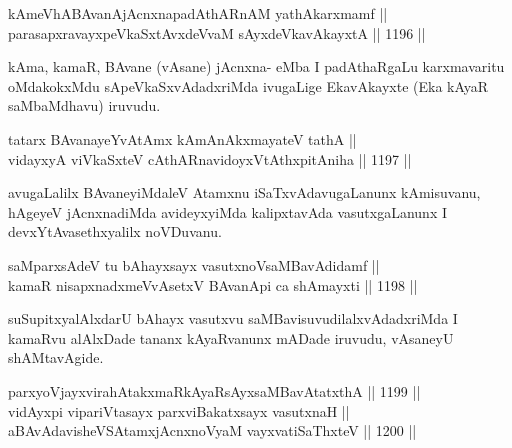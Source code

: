 
\begin{shl}
kAmeVhABAvanAjAcnxnapadAthARnAM yathAkarxmamf || \\
parasapxravayxpeVkaSxtAvxdeVvaM sAyx\footnotemark[2]deVkavAkayxtA \hfill || 1196 ||  
\end{shl}

\begin{artha}
kAma, kamaR, BAvane (vAsane) jAcnxna- eMba I padAthaRgaLu karxmavaritu oMdakokxMdu sApeVkaSxvAdadxriMda ivugaLige EkavAkayxte (Eka kAyaR saMbaMdhavu) iruvudu.
\end{artha}


\begin{shl}
tatarx BAvanayeYvA\s \s tAmx kAmAnAkxmayateV tathA || \\
vidayxyA viVkaSxteV cAthARnavidoyxVtAthxpitAniha \hfill || 1197 ||  
\end{shl}

\begin{artha}
avugaLalilx BAvaneyiMdaleV Atamxnu iSaTxvAdavugaLanunx kAmisuvanu, hAgeyeV jAcnxnadiMda avideyxyiMda kalipxtavAda vasutxgaLanunx I devxYtAvasethxyalilx noVDuvanu.
\end{artha}

\begin{shl}
\footnotemark[1]saMparxsAdeV tu bAhayxsayx vasutxnoV\s saMBavAdidamf || \\
kamaR nisapxnadxmeVvA\s \s setxV BAvanA\s pi ca shAmayxti \hfill || 1198 ||  
\end{shl}

\begin{artha}
suSupitxyalAlxdarU bAhayx vasutxvu saMBavisuvudilalxvAdadxriMda I kamaRvu alAlxDade tananx kAyaRvanunx mADade iruvudu, vAsaneyU shAMtavAgide.
\end{artha}

\begin{shl}
parxyoVjayxvirahAtakxmaRkAyaRsAyxsaMBavAtatxthA \hfill || 1199 ||  \\
vidAyx\s pi \footnotemark[2]vipariVtasayx parxviBakatxsayx vasutxnaH || \\
aBAvAdavisheVSAtamxjAcnxnoV\s yaM vayxvatiSaThxteV \hfill || 1200 || 
\end{shl}


